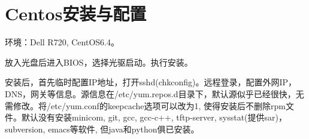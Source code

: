 \section{Centos安装与配置}
环境：Dell R720, CentOS6.4。

放入光盘后进入BIOS，选择光驱启动。执行安装。

安装后，首先临时配置IP地址，打开sshd(chkconfig)。远程登录，配置外网IP，DNS，网关等信息。源信息在/etc/yum.repos.d目录下，默认源似乎已经很快，无需修改。将/etc/yum.conf的keepcache选项可以改为1, 使得安装后不删除rpm文件。默认没有安装minicom, git, gcc, gcc-c++, tftp-server, sysstat(提供sar)，subversion, emacs等软件, 但java和python俱已安装。






